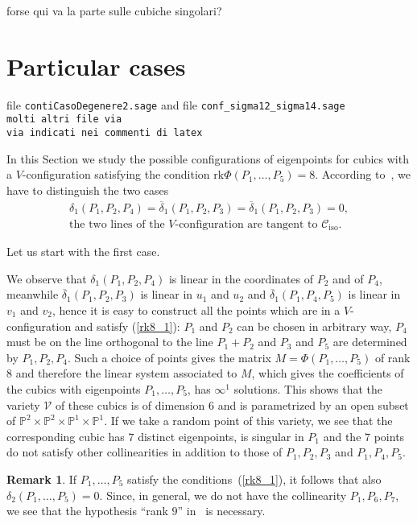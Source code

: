 \documentclass[11pt, a4paper, reqno, captions=tableheading,bibliography=totoc]{scrartcl}
\theoremstyle{plain}
\theoremstyle{definition}
\newtheorem{rmk}[lemma]{Remark}
\newcommand{\iso}{\mathcal{C}_{\mathrm{iso}}}
\newcommand{\rk}{\ensuremath{\mathrm{rk}}}
\begin{document}
forse qui va la parte sulle cubiche singolari?

\section{Particular cases}
file \verb+contiCasoDegenere2.sage+ and file
\verb+conf_sigma12_sigma14.sage+\\
\verb+molti altri file via +\\
\verb+via indicati nei commenti di latex+

In this Section we study the possible configurations of
eigenpoints for cubics with a $V$-configuration
satisfying the condition $\rk \Phi(P_1, \dots, P_5) = 8$. According
to~, we have to distinguish the two cases
\begin{eqnarray}
\delta_1(P_1, P_2, P_4)=\overline{\delta}_1(P_1, P_2, P_3) =
\overline{\delta}_1(P_1, P_2, P_3)=0,
\label{rk8_1}\\
\mbox{the two lines of the $V$-configuration are tangent to $\iso$} .
\label{rk8_2}
\end{eqnarray}

Let us start with the first case.

We observe that $\delta_1(P_1, P_2, P_4)$ is linear in the coordinates
of $P_2$ and of $P_4$, meanwhile $\overline{\delta}_1(P_1, P_2, P_3)$
is linear in $u_1$ and $u_2$ and $\overline{\delta}_1(P_1, P_4, P_5)$
is linear in $v_1$ and $v_2$, hence it is easy to construct
all the points which are in a $V$-configuration and satisfy (\ref{rk8_1}):
$P_1$ and $P_2$ can be chosen in arbitrary way,
$P_4$ must be on the line orthogonal to the line $P_1+P_2$ and $P_3$ and
$P_5$ are determined by $P_1, P_2, P_4$. Such a choice
of points gives the matrix $M = \Phi(P_1, \dots, P_5)$ of rank $8$ and
therefore the linear system associated to $M$, which gives the
coefficients of the cubics with eigenpoints $P_1, \dots, P_5$, has $\infty^1$
solutions. This shows that the variety $\mathcal{V}$ of these cubics is
of dimension $6$ and is parametrized by an open subset of 
$\mathbb{P}^2 \times \mathbb{P}^2\times \mathbb{P}^1\times \mathbb{P}^1$.
If we take a random point of this variety, we see that the corresponding
cubic has $7$ distinct eigenpoints, is singular in $P_1$ and the $7$ points
do not satisfy other collinearities in addition to those of $P_1, P_2, P_3$
and $P_1, P_4, P_5$.

\begin{rmk} If $P_1, \dots, P_5$ satisfy the conditions~(\ref{rk8_1}),
it follows that also $\delta_2(P_1, \dots, P_5) = 0$. Since, 
in general, we do not have the collinearity $P_1, P_6, P_7$,
we see that the hypothesis ``rank $9$''
in~ is necessary.
\end{rmk}
\end{document}
